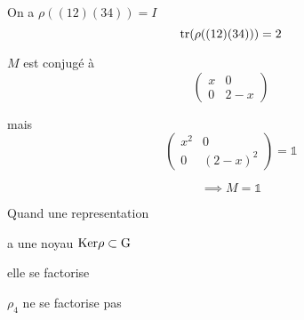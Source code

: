 On a $\rho((12)(34)) = I$
\[  \tr(\rho((12)(34))) = 2\]

$M $ est conjugé à \[ \begin{pmatrix} x & 0 \\ 0 & 2-x \end{pmatrix}  \]

mais \[ \begin{pmatrix} x^{2}& 0 \\ 0 &(2-x)^2 \end{pmatrix} = \mathds{1} \]

\[ \implies M = \mathds{1} \]

Quand une representation


a une noyau $\rm{Ker} \rho \subset G$

elle se factorise

$\rho_4$ ne se factorise pas 



